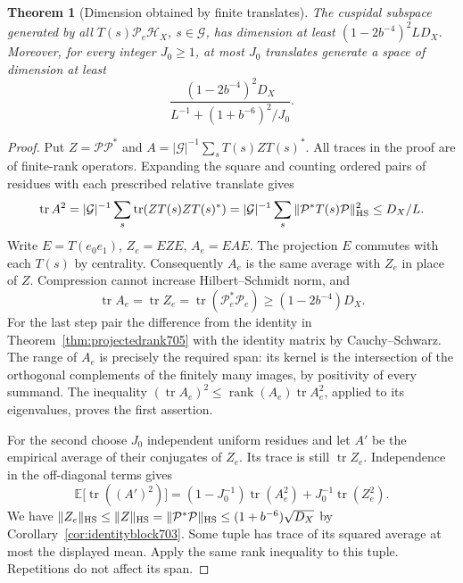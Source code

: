 \documentclass[a4paper,11pt]{article}
\newtheorem{theorem}[proposition]{Theorem}
\theoremstyle{definition}
\theoremstyle{remark}
\numberwithin{equation}{section}
\begin{document}
\begin{theorem}[Dimension obtained by finite translates]\leavevmode
\label{thm:translates706}
The cuspidal subspace generated by all
\(T(s)\mathcal P_e\mathcal H_X\), \(s\in\mathcal G\),
has dimension at least \((1-2b^{-4})^2 L D_X\). Moreover,
for every integer \(J_0\ge1\), at most \(J_0\) translates
generate a space of dimension at least
\[
      \frac{(1-2b^{-4})^2D_X}{L^{-1}+(1+b^{-6})^2/J_0}.
\]
\end{theorem}
\begin{proof}
Put \(Z=\mathcal P\mathcal P^*\) and
\(A=|\mathcal G|^{-1}\sum_s T(s)ZT(s)^*\). All traces in
the proof are of finite-rank operators. Expanding the square
and counting ordered pairs of residues with each prescribed
relative translate gives
\[
 \operatorname{tr}A^2
   =|\mathcal G|^{-1}\sum_s\operatorname{tr}
                     (ZT(s)ZT(s)^*)
   =|\mathcal G|^{-1}\sum_s
                     \|\mathcal P^*T(s)\mathcal P\|_{\rm HS}^2
   \le D_X/L .
\]
Write \(E=T(e_0e_1)\), \(Z_e=EZE\), \(A_e=EAE\).
The projection \(E\) commutes with each \(T(s)\) by
centrality. Consequently \(A_e\) is the same average with
\(Z_e\) in place of \(Z\). Compression cannot increase
Hilbert--Schmidt norm, and
\[
 \operatorname{tr}A_e=\operatorname{tr}Z_e
       =\operatorname{tr}(\mathcal P_e^*\mathcal P_e)
                  \ge (1-2b^{-4})D_X .
\]
For the last step pair the difference from the identity
in Theorem~\ref{thm:projectedrank705} with the identity
matrix by Cauchy--Schwarz. The range of \(A_e\) is precisely
the required span: its kernel is the intersection of the
orthogonal complements of the finitely many images, by
positivity of every summand. The inequality
\((\operatorname{tr}A_e)^2\le\operatorname{rank}(A_e)
\operatorname{tr}A_e^2\), applied to its eigenvalues,
proves the first assertion.

For the second choose \(J_0\) independent uniform residues
and let \(A'\) be the empirical average of their conjugates
of \(Z_e\). Its trace is still \(\operatorname{tr}Z_e\).
Independence in the off-diagonal terms gives
\[
 \mathbb E\big[\operatorname{tr}((A')^2)\big]
   =(1-J_0^{-1})\operatorname{tr}(A_e^2)
                         +J_0^{-1}\operatorname{tr}(Z_e^2).
\]
We have
\(\|Z_e\|_{\rm HS}\le\|Z\|_{\rm HS}=
\|\mathcal P^*\mathcal P\|_{\rm HS}\le(1+b^{-6})\sqrt{D_X}\)
by Corollary~\ref{cor:identityblock703}. Some tuple has
trace of its squared average at most the displayed mean.
Apply the same rank inequality to this tuple. Repetitions
do not affect its span.
\end{proof}
\end{document}
